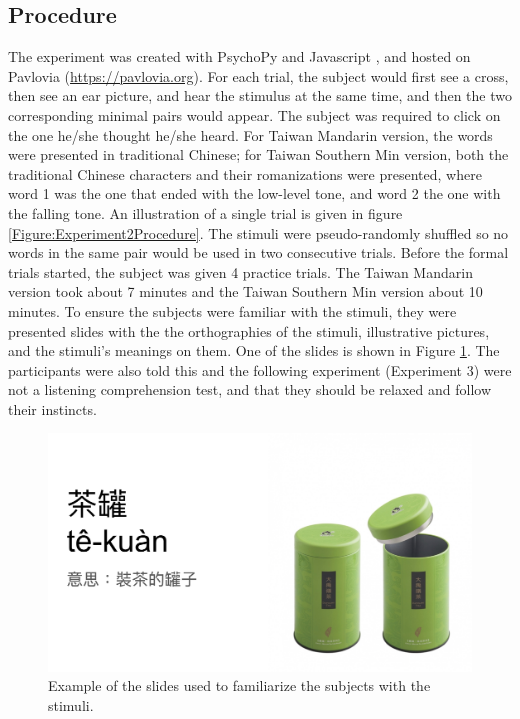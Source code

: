 \documentclass[12pt]{report}
\begin{document}
\begin{CJK}{UTF8}{bsmi}
\subsection{Procedure}
The experiment was created with PsychoPy \citep{Peirce2019} and Javascript \citep{Flanagan2006}, and hosted on Pavlovia (\url{https://pavlovia.org}). For each trial, the subject would first see a cross, then see an ear picture, and hear the stimulus at the same time, and then the two corresponding minimal pairs would appear. The subject was required to click on the one he/she thought he/she heard. For Taiwan Mandarin version, the words were presented in traditional Chinese; for Taiwan Southern Min version, both the traditional Chinese characters and their romanizations were presented, where word 1 was the one that ended with the low-level tone, and word 2 the one with the falling tone. An illustration of a single trial is given in figure  \ref{Figure:Experiment2Procedure}. The stimuli were pseudo-randomly shuffled so no words in the same pair would be used in two consecutive trials. Before the formal trials started, the subject was given 4 practice trials. The Taiwan Mandarin version took about 7 minutes and the Taiwan Southern Min version about 10 minutes. To ensure the subjects were familiar with the stimuli, they were presented slides with the the orthographies of the stimuli, illustrative pictures, and the stimuli's meanings on them. One of the slides is shown in Figure \ref{Figure:Experiment2SlideExample}. The participants were also told this and the following experiment (Experiment 3) were not a listening comprehension test, and that they should be relaxed and follow their instincts.

\begin{figure}[h]
\centering
\includegraphics[width=.7\textwidth]{Figures/E2/SlideExample.jpg}
\caption{Example of the slides used to familiarize the subjects with the stimuli.}
\label{Figure:Experiment2SlideExample}
\end{figure}



\end{CJK}
\end{document}
